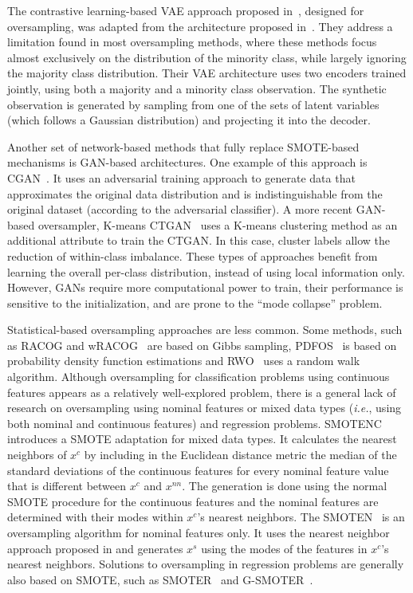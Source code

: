 The contrastive learning-based VAE approach proposed
in~\cite{dai2019generative}, designed for oversampling, was adapted from
the architecture proposed in~\cite{abid2019contrastive}. They address a
limitation found in most oversampling methods, where these methods focus
almost exclusively on the distribution of the minority class, while largely
ignoring the majority class distribution. Their VAE architecture uses two
encoders trained jointly, using both a majority and a minority class
observation. The synthetic observation is generated by sampling from one of
the sets of latent variables (which follows a Gaussian distribution) and
projecting it into the decoder.

Another set of network-based methods that fully replace SMOTE-based mechanisms
is GAN-based architectures. One example of this approach is
CGAN~\cite{douzas2018effective}. It uses an adversarial training approach to
generate data that approximates the original data distribution and is
indistinguishable from the original dataset (according to the adversarial
classifier). A more recent GAN-based oversampler, K-means CTGAN~\cite{an2021k}
uses a K-means clustering method as an additional attribute to train the
CTGAN\@. In this case, cluster labels allow the reduction of within-class
imbalance. These types of approaches benefit from learning the overall
per-class distribution, instead of using local information only. However, GANs
require more computational power to train, their performance is sensitive to
the initialization, and are prone to the ``mode collapse'' problem.

Statistical-based oversampling approaches are less common. Some methods, such
as RACOG and wRACOG~\cite{das2014racog} are based on Gibbs sampling,
PDFOS~\cite{gao2014pdfos} is based on probability density function estimations
and RWO~\cite{zhang2014rwo} uses a random walk algorithm. Although
oversampling for classification problems using continuous features appears as
a relatively well-explored problem, there is a general lack of research on
oversampling using nominal features or mixed data types (\textit{i.e.}, using
both nominal and continuous features) and regression problems.
SMOTENC~\cite{Chawla2002} introduces a SMOTE adaptation for mixed data
types. It calculates the nearest neighbors of $x^c$ by including in the
Euclidean distance metric the median of the standard deviations of the
continuous features for every nominal feature value that is different
between $x^c$ and $x^{nn}$. The generation is done using the normal SMOTE
procedure for the continuous features and the nominal features are determined
with their modes within $x^c$'s nearest neighbors. The
SMOTEN~\cite{Chawla2002} is an oversampling algorithm for nominal
features only. It uses the nearest neighbor approach proposed in
\cite{cost1993weighted} and generates $x^s$ using the modes of the features
in $x^c$'s nearest neighbors. Solutions to oversampling in regression problems
are generally also based on SMOTE, such as SMOTER~\cite{torgo2013smote} and
G-SMOTER~\cite{camacho2022geometric}.

